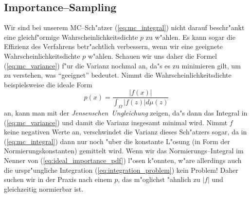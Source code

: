 	\subsection{Importance--Sampling}
	Wir sind bei unserem MC--Sch"atzer (\ref{eq:mc_integral}) nicht darauf beschr"ankt eine gleich\-f"or\-mi\-ge Wahrscheinlichkeitsdichte $p$ zu w"ahlen. Es kann sogar die Effizienz des Verfahrens betr"achtlich verbessern, wenn wir eine geeignete Wahrscheinlichkeitsdichte $p$ w"ahlen. Schauen wir uns daher die Formel (\ref{eq:mc_variance}) f"ur die Varianz nochmal an, da"s es zu minimieren gilt, um zu verstehen, was ``geeignet'' bedeutet. Nimmt die Wahrscheinlichkeitsdichte beispielsweise die ideale Form
	\begin{equation}
		p(x)=\frac{|f(x)|}{\int_\Omega |f(z)|d\mu(z)}
		\label{eq:ideal_importance_pdf}
	\end{equation}
	an, kann man mit der {\em Jensenschen~Ungleichung} zeigen, da"s dann das Integral in (\ref{eq:mc_variance}) und damit die Varianz insgesamt minimal wird. Nimmt $f$ keine negativen Werte an, verschwindet die Varianz dieses Sch"atzers sogar, da in (\ref{eq:mc_integral}) dann nur noch "uber die konstante L"osung (in Form der Normierungskonstanten) gemittelt wird. Wenn wir das Normierungs--Integral im Nenner von (\ref{eq:ideal_importance_pdf}) l"osen k"onnten, w"are allerdings auch die urspr"ungliche Integration (\ref{eq:integration_problem}) kein Problem! Daher suchen wir in der Praxis nach einem $p$, das m"oglichst "ahnlich zu $|f|$ und gleichzeitig normierbar ist.
	
